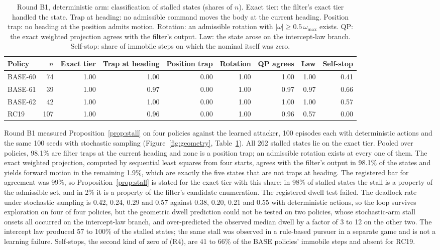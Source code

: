 \documentclass{l4dc2027}
\newcommand{\wmax}{\omega_{\max}}
\begin{document}
\begin{table}[t]
\centering\small
\caption{Round B1, deterministic arm: classification of stalled states (shares of $n$). Exact tier: the filter's exact tier handled the state. Trap at heading: no admissible command moves the body at the current heading. Position trap: no heading at the position admits motion. Rotation: an admissible rotation with $|\omega| \ge 0.5\,\wmax$ exists. QP: the exact weighted projection agrees with the filter's output. Law: the state arose on the intercept-law branch. Self-stop: share of immobile steps on which the nominal itself was zero.}
\label{tab:b1}
\begin{tabular}{@{}lrrrrrrrr@{}}
\toprule
Policy & $n$ & Exact tier & Trap at heading & Position trap & Rotation & QP agrees & Law & Self-stop \\
\midrule
BASE-60 & 74 & 1.00 & 1.00 & 0.00 & 1.00 & 1.00 & 1.00 & 0.41 \\
BASE-61 & 39 & 1.00 & 0.97 & 0.00 & 1.00 & 0.97 & 0.97 & 0.66 \\
BASE-62 & 42 & 1.00 & 1.00 & 0.00 & 1.00 & 1.00 & 1.00 & 0.57 \\
RC19 & 107 & 1.00 & 0.96 & 0.00 & 1.00 & 0.96 & 0.57 & 0.00 \\
\bottomrule
\end{tabular}
\end{table}

Round B1 measured Proposition~\ref{prop:stall} on four policies against the learned attacker, 100 episodes each with deterministic actions and the same 100 seeds with stochastic sampling (Figure~\ref{fig:geometry}, Table~\ref{tab:b1}). All 262 stalled states lie on the exact tier. Pooled over policies, 98.1\% are filter traps at the current heading and none is a position trap; an admissible rotation exists at every one of them. The exact weighted projection, computed by sequential least squares from four starts, agrees with the filter's output in 98.1\% of the states and yields forward motion in the remaining 1.9\%, which are exactly the five states that are not traps at heading. The registered bar for agreement was 99\%, so Proposition~\ref{prop:stall} is stated for the exact tier with this share: in 98\% of stalled states the stall is a property of the admissible set, and in 2\% it is a property of the filter's candidate enumeration. The registered dwell test failed. The deadlock rate under stochastic sampling is 0.42, 0.24, 0.29 and 0.57 against 0.38, 0.20, 0.21 and 0.55 with deterministic actions, so the loop survives exploration on four of four policies, but the geometric dwell prediction could not be tested on two policies, whose stochastic-arm stall onsets all occurred on the intercept-law branch, and over-predicted the observed median dwell by a factor of 3 to 12 on the other two. The intercept law produced 57 to 100\% of the stalled states; the same stall was observed in a rule-based pursuer in a separate game and is not a learning failure. Self-stops, the second kind of zero of (R4), are 41 to 66\% of the BASE policies' immobile steps and absent for RC19.
\end{document}
